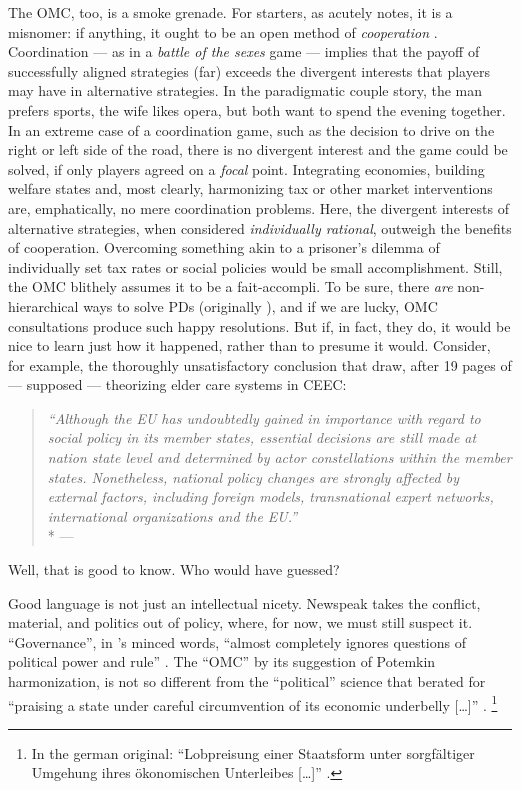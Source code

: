 The \gls{OMC}, too, is a smoke grenade.
For starters, as \citeauthor{Offe2003} acutely notes, it is a misnomer:
if anything, it ought to be an open method of \emph{cooperation} \citeyearpar[467]{Offe2003}.
Coordination --- as in a \emph{battle of the sexes} game --- implies that the payoff of successfully aligned strategies (far) exceeds the divergent interests that players may have in alternative strategies.
In the paradigmatic couple story, the man prefers sports, the wife likes opera, but both want to spend the evening together.
In an extreme case of a coordination game, such as the decision to drive on the right or left side of the road, there is no divergent interest and the game could be solved, if only players agreed on a \emph{focal} point.
Integrating economies, building welfare states and, most clearly, harmonizing tax or other market interventions are, emphatically, no mere coordination problems.
Here, the divergent interests of alternative strategies, when considered \emph{individually rational}, outweigh the benefits of cooperation.
Overcoming something akin to a prisoner's dilemma of individually set tax rates or social policies would be small accomplishment.
Still, the \gls{OMC} blithely assumes it to be a fait-accompli.
To be sure, there \emph{are} non-hierarchical ways to solve \glspl{PD} (originally \citealt{Axelrod1980}), and if we are lucky, \gls{OMC} consultations produce such happy resolutions.
But if, in fact, they do, it would be nice to learn just how it happened, rather than to presume it would.
Consider, for example, the thoroughly unsatisfactory conclusion that \citeauthor{Theobald2009} draw, after 19 pages of --- supposed --- theorizing elder care systems in \gls{CEEC}:

\begin{quote}
	\emph{``Although the \gls{EU} has undoubtedly gained in importance with regard to social policy in its member states, essential decisions are still made at nation state level and determined by actor constellations within the member states.
	Nonetheless, national policy changes are strongly affected by external factors, including foreign models, transnational expert networks, international organizations and the \gls{EU}.''}
	\\*
	--- \citet[163]{Theobald2009}
\end{quote}

Well, that is good to know.
Who would have guessed?

Good language is not just an intellectual nicety.
Newspeak takes the conflict, material, and politics out of policy, where, for now, we must still suspect it.
``Governance'', in \citeauthor{Jachtenfuchs2001}'s minced words, ``almost completely ignores questions of political power and rule'' \citeyearpar[258]{Jachtenfuchs2001}.
The ``\gls{OMC}'' by its suggestion of Potemkin harmonization, is not so different from the ``political'' science that \cite{Agnoli-1989-aa} berated for ``praising a state under careful circumvention of its economic underbelly [\ldots]'' \citeyearpar[195]{Agnoli-1989-aa}.
\footnote{
	In the german original:
	``Lobpreisung einer Staatsform unter sorgfältiger Umgehung ihres ökonomischen Unterleibes [\ldots]'' \citep[195]{Agnoli-1989-aa}.
}

